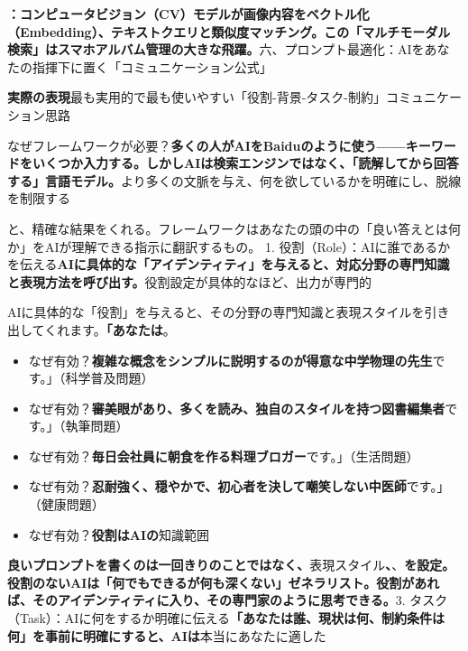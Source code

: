 
\textbf{：コンピュータビジョン（CV）モデルが画像内容をベクトル化（Embedding）、テキストクエリと類似度マッチング。この「マルチモーダル検索」はスマホアルバム管理の大きな飛躍。}六、プロンプト最適化：AIをあなたの指揮下に置く「コミュニケーション公式」

\textbf{実際の表現}最も実用的で最も使いやすい「役割-背景-タスク-制約」コミュニケーション思路


なぜフレームワークが必要？\textbf{多くの人がAIをBaiduのように使う——キーワードをいくつか入力する。しかしAIは検索エンジンではなく、「読解してから回答する」言語モデル。}より多くの文脈を与え、何を欲しているかを明確にし、脱線を制限する

\begin{tcbinfo}{と、精確な結果をくれる。フレームワークはあなたの頭の中の「良い答えとは何か」をAIが理解できる指示に翻訳するもの。}
1. 役割（Role）：AIに誰であるかを伝える\textbf{AIに具体的な「アイデンティティ」を与えると、対応分野の専門知識と表現方法を呼び出す。}役割設定が具体的なほど、出力が専門的

\end{tcbinfo}


AIに具体的な「役割」を与えると、その分野の専門知識と表現スタイルを引き出してくれます。\textbf{「あなたは}。


\begin{itemize}
  \item なぜ有効？\textbf{複雑な概念をシンプルに説明するのが得意な中学物理の先生}です。」（科学普及問題）
  \item なぜ有効？\textbf{審美眼があり、多くを読み、独自のスタイルを持つ図書編集者}です。」（執筆問題）
  \item なぜ有効？\textbf{毎日会社員に朝食を作る料理ブロガー}です。」（生活問題）
  \item なぜ有効？\textbf{忍耐強く、穏やかで、初心者を決して嘲笑しない中医師}です。」（健康問題）
  \item なぜ有効？\textbf{役割はAIの}知識範囲
\end{itemize}

\textbf{良いプロンプトを書くのは一回きりのことではなく、}表現スタイル\textbf{、}、\textbf{を設定。役割のないAIは「何でもできるが何も深くない」ゼネラリスト。役割があれば、そのアイデンティティに入り、その専門家のように思考できる。}3. タスク（Task）：AIに何をするか明確に伝える\textbf{「あなたは誰、現状は何、制約条件は何」を事前に明確にすると、AIは}本当にあなたに適した

